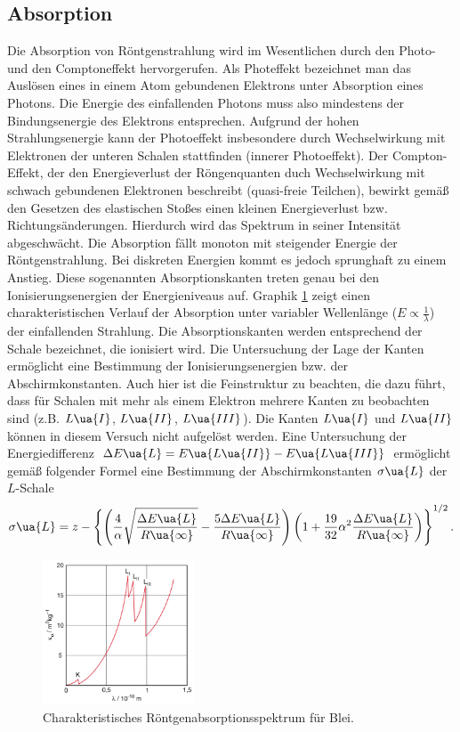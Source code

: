 \subsection{Absorption}
Die Absorption von Röntgenstrahlung wird im Wesentlichen durch den Photo- und den Comptoneffekt hervorgerufen.
Als Photeffekt bezeichnet man das Auslösen eines in einem Atom gebundenen Elektrons unter Absorption eines Photons. Die
Energie des einfallenden Photons muss also mindestens der Bindungsenergie des Elektrons entsprechen.
Aufgrund der hohen Strahlungsenergie kann der Photoeffekt insbesondere durch Wechselwirkung mit Elektronen der unteren
Schalen stattfinden (innerer Photoeffekt). Der Compton-Effekt, der den Energieverlust der Röngenquanten duch Wechselwirkung
mit schwach gebundenen Elektronen beschreibt (quasi-freie Teilchen), bewirkt gemäß den Gesetzen des elastischen Stoßes
einen kleinen Energieverlust bzw. Richtungsänderungen.
Hierdurch wird das Spektrum in seiner Intensität abgeschwächt.
Die Absorption
fällt monoton mit steigender Energie der Röntgenstrahlung. Bei diskreten Energien kommt es jedoch sprunghaft zu einem Anstieg. Diese
sogenannten Absorptionskanten treten genau bei den Ionisierungsenergien der Energieniveaus auf.
Graphik \ref{fig: absorption} zeigt einen charakteristischen
Verlauf der Absorption unter variabler Wellenlänge ($E \propto \frac{1}{\lambda}$) der einfallenden Strahlung.
Die Absorptionskanten werden entsprechend der Schale bezeichnet, die ionisiert wird. Die Untersuchung der Lage der Kanten
ermöglicht eine Bestimmung der Ionisierungsenergien bzw. der Abschirmkonstanten.
Auch hier ist die Feinstruktur zu beachten, die dazu
führt, dass für Schalen mit mehr als einem Elektron mehrere Kanten zu beobachten sind (z.B. $L\ua{I}$, $L\ua{II}$, $L\ua{III}$).
Die Kanten $L\ua{I}$ und $L\ua{II}$ können in diesem Versuch nicht aufgelöst werden. Eine Untersuchung der Energiedifferenz
$\Delta E\ua{L} = E\ua{L\ua{II}} - E\ua{L\ua{III}}$ ermöglicht gemäß folgender Formel eine Bestimmung der Abschirmkonstanten
$\sigma\ua{L}$ der $L$-Schale
\begin{equation}
  \sigma\ua{L} = z - \left\{ \left(\frac{4}{\alpha}\sqrt{\frac{\Delta E\ua{L}}{R\ua{\infty}}} -\frac{5\Delta E\ua{L}}{R\ua{\infty}} \right)
  \left(1 + \frac{19}{32}\alpha^2\frac{\Delta E\ua{L}}{R\ua{\infty}} \right)  \right\}^{1/2}.
\end{equation}
\begin{figure}[H]
  \centering
  \includegraphics[width = 0.4\textwidth]{pics/absorption.png}
  \caption{Charakteristisches Röntgenabsorptionsspektrum für Blei\cite{dem}.}
  \label{fig: absorption}
\end{figure}


